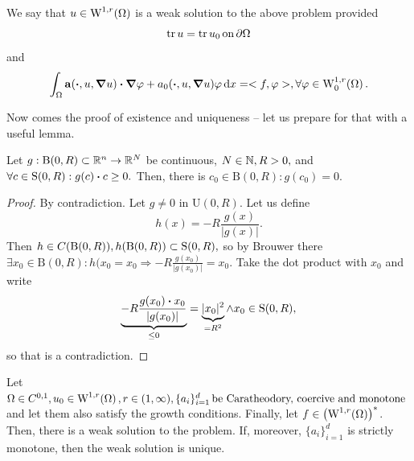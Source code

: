 \documentclass{article}
\begin{document}
\begin{definition}
	We say that $u \in \WkpSet[1][r]{\Omega}$ is a weak solution to the above problem provided
	\[
		\trace u = \trace u_0 \, \text{on} \, \partial \Omega
	\]
	and 
	\[
		\int_{\Omega}\vb{a}\qty(\vdot, u, \grad u)\vdot \grad \varphi +a_0\qty(\vdot, u, \grad u) \varphi \dd{x} = <f,\varphi>, \forall \varphi \in \WkpzeroSet[1][r]{\Omega}.
	\]
\end{definition}

Now comes the proof of existence and uniqueness -- let us prepare for that with a useful lemma.

\begin{lemma}
	Let $g: \text{B}(0,R) \subset {\mathbb R}^n \to {\mathbb R}^N$ be continuous, $N \in {\mathbb N}, R>0,$ and $\forall c \in \text{S}(0,R): g(c) \vdot c \geq 0.$ Then, there is $c_0 \in \text{B}(0,R): g(c_0) = 0.$
	\begin{proof}
		By contradiction. Let $g \neq 0$ in $\text{U}(0,R)$. Let us define
		\[
			h(x) = -R\frac{g(x)}{|g(x)|}.
		\]
		Then $h \in C\qty(\text{B}(0,R)), h\qty(\text{B}(0,R)) \subset \text{S}(0,R),$ so by Brouwer there $\exists x_0 \in \text{B}(0,R): h(x_0 = x_0 \Rightarrow -R \frac{g(x_0)}{|g(x_0)|} = x_0.$ Take the dot product with $x_0$ and write
		\[
			\underbrace{-R \frac{g(x_0) \vdot x_0}{|g(x_0)|}}_{\leq 0} = \underbrace{|x_0|^{2}}_{ = R^{2}} \wedge x_0 \in \text{S}(0,R),
		\]
		so that is a contradiction.
	\end{proof}
\end{lemma}


\begin{theorem}
	Let $\Omega \in C^{0,1}, u_0 \in \WkpSet[1][r]{\Omega}, r \in (1,\infty), \{a_i\}_{i=1}^d \, \text{be Caratheodory, coercive and monotone } \,$ and let them also satisfy the growth conditions. Finally, let $f \in \qty(\WkpSet[1][r]{\Omega})^{*}$. Then, there is a weak solution to the problem.
	If, moreover, $\{a_i\}_{i=1}^d$ is strictly monotone, then the weak solution is unique.
\end{theorem}
\end{document}
